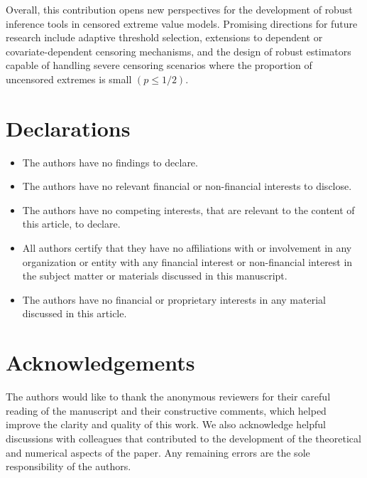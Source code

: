 \documentclass[reqno,openbib,runningheads,a4paper,12pt]{amsart}%
\begin{document}
\noindent Overall, this contribution opens new perspectives for the
development of robust inference tools in censored extreme value models.
Promising directions for future research include adaptive threshold selection,
extensions to dependent or covariate-dependent censoring mechanisms, and the
design of robust estimators capable of handling severe censoring scenarios
where the proportion of uncensored extremes is small $(p\leq1/2).$

\section*{\textbf{Declarations}}

\begin{itemize}
\item The authors have no findings to declare.

\item The authors have no relevant financial or non-financial interests to disclose.

\item The authors have no competing interests, that are relevant to the
content of this article, to declare.

\item All authors certify that they have no affiliations with or involvement
in any organization or entity with any financial interest or non-financial
interest in the subject matter or materials discussed in this manuscript.

\item The authors have no financial or proprietary interests in any material
discussed in this article.
\end{itemize}

\section{\textbf{Acknowledgements}}

\noindent The authors would like to thank the anonymous reviewers for their
careful reading of the manuscript and their constructive comments, which
helped improve the clarity and quality of this work. We also acknowledge
helpful discussions with colleagues that contributed to the development of the
theoretical and numerical aspects of the paper. Any remaining errors are the
sole responsibility of the authors.
\end{document}

